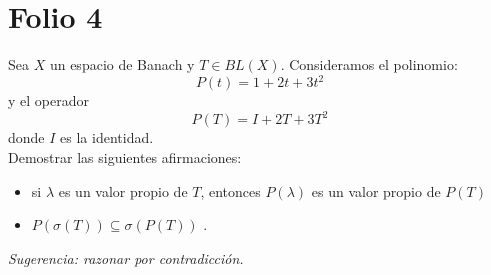 
\section{Folio 4}

\begin{ejercicio} %
    Sea $X$ un espacio de Banach y $T \in BL(X)$. Consideramos el polinomio:
    \[ P(t) = 1 + 2t + 3t^2 \]
    y el operador
    \[ P(T) = I + 2T + 3T^2 \]
    donde $I$ es la identidad. \\
    Demostrar las siguientes afirmaciones:
    \begin{itemize}
        \item[i)] si $\lambda$ es un valor propio de $T$, entonces $P(\lambda)$ es un valor propio de $P(T)$
        \item[ii)] $P(\sigma(T)) \subseteq \sigma(P(T))$ .
    \end{itemize}
    \textit{Sugerencia: razonar por contradicción.}
\end{ejercicio}

